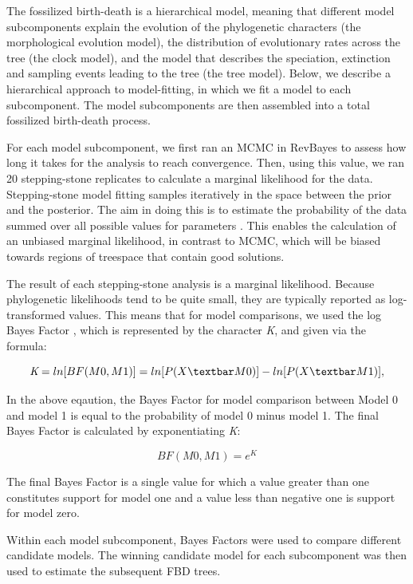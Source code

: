 \documentclass{article}
\begin{document}
The fossilized birth-death is a hierarchical model, meaning that different model subcomponents explain the evolution of the phylogenetic characters (the morphological evolution model), the distribution of evolutionary rates across the tree (the clock model), and the model that describes the speciation, extinction and sampling events leading to the tree (the tree model). 
Below, we describe a hierarchical approach to model-fitting, in which we fit a model to each subcomponent.
The model subcomponents are then assembled into a total fossilized birth-death process.

For each model subcomponent, we first ran an MCMC in RevBayes to assess how long it takes for the analysis to reach convergence. 
Then, using this value, we ran 20 stepping-stone replicates to calculate a marginal likelihood for the data.
Stepping-stone model fitting samples iteratively in the space between the prior and the posterior.
The aim in doing this is to estimate the probability of the data summed over all possible values for parameters  \citep{Xie2011}. 
This enables the calculation of an unbiased marginal likelihood, in contrast to MCMC, which will be biased towards regions of treespace that contain good solutions. 

The result of each stepping-stone analysis is a marginal likelihood.
Because phylogenetic likelihoods tend to be quite small, they are typically reported as log-transformed values.
This means that for model comparisons, we used the log Bayes Factor \citep{Kass1995}, which is represented by the character \textit{K}, and given via the formula:

\begin{center}
  \[  \textit{K}=ln[BF(M0,M1)]=ln[P(X \textbar M0)] - ln[P(X \textbar M1)],  \]
\end{center}    
    
In the above eqaution, the Bayes Factor for model comparison between Model 0 and model 1 is equal to the probability of model 0 minus model 1. The final Bayes Factor is calculated by exponentiating \textit{K}:

\begin{center}
  \[  BF(M0,M1)=\textit{e}^\textit{K} \]
\end{center}

The final Bayes Factor is a single value for which a value greater than one constitutes support for model one and a value less than negative one is support for model zero. 

 Within each model subcomponent, Bayes Factors were used to compare different candidate models. 
The winning candidate model for each subcomponent was then used to estimate the subsequent FBD trees.
\end{document}
